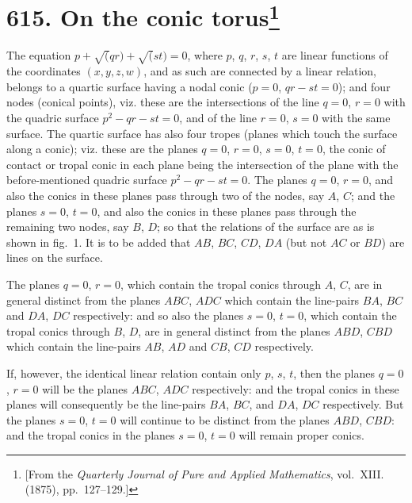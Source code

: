 \documentclass[11pt,a4paper]{book}
\begin{document}
\newpage
\section[On the conic torus]{\textbf{615.} On the conic torus\footnote{[From the \textit{Quarterly Journal of Pure and Applied Mathematics}, vol.~XIII. (1875), pp.~127--129.]}}

The equation $p + \surd(qr) + \surd(st) = 0$, where $p$, $q$, $r$, $s$, $t$ are linear functions of the coordinates $(x, y, z, w)$, and as such are connected by a linear relation, belongs to a quartic surface having a nodal conic ($p = 0$, $qr - st = 0$); and four nodes (conical points), viz. these are the intersections of the line $q = 0$, $r = 0$ with the quadric surface $p^2 - qr - st = 0$, and of the line $r = 0$, $s = 0$ with the same surface. The quartic surface has also four tropes (planes which touch the surface along a conic); viz. these are the planes $q = 0$, $r = 0$, $s = 0$, $t = 0$, the conic of contact or tropal conic in each plane being the intersection of the plane with the before-mentioned quadric surface $p^2 - qr - st = 0$. The planes $q = 0$, $r = 0$, and also the conics in these planes pass through two of the nodes, say $A$, $C$; and the planes $s = 0$, $t = 0$, and also the conics in these planes pass through the remaining two nodes, say $B$, $D$; so that the relations of the surface are as is shown in fig.~1. It is to be added that $AB$, $BC$, $CD$, $DA$ (but not $AC$ or $BD$) are lines on the surface.

The planes $q = 0$, $r = 0$, which contain the tropal conics through $A$, $C$, are in general distinct from the planes $ABC$, $ADC$ which contain the line-pairs $BA$, $BC$ and $DA$, $DC$ respectively: and so also the planes $s = 0$, $t = 0$, which contain the tropal conics through $B$, $D$, are in general distinct from the planes $ABD$, $CBD$ which contain the line-pairs $AB$, $AD$ and $CB$, $CD$ respectively.

If, however, the identical linear relation contain only $p$, $s$, $t$, then the planes $q = 0$, $r = 0$ will be the planes $ABC$, $ADC$ respectively: and the tropal conics in these planes will consequently be the line-pairs $BA$, $BC$, and $DA$, $DC$ respectively. But the planes $s = 0$, $t = 0$ will continue to be distinct from the planes $ABD$, $CBD$: and the tropal conics in the planes $s = 0$, $t = 0$ will remain proper conics.
\end{document}
